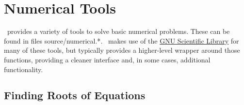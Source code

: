 \section{Numerical Tools}

\glc\ provides a variety of tools to solve basic numerical problems. These can be found in files {\normalfont \ttfamily source/numerical.*}. \glc\ makes use of the \href{http://www.gnu.org/software/gsl/}{GNU Scientific Library} for many of these tools, but typically provides a higher-level wrapper around those functions, providing a cleaner interface and, in some cases, additional functionality.

\subsection{Finding Roots of Equations}


